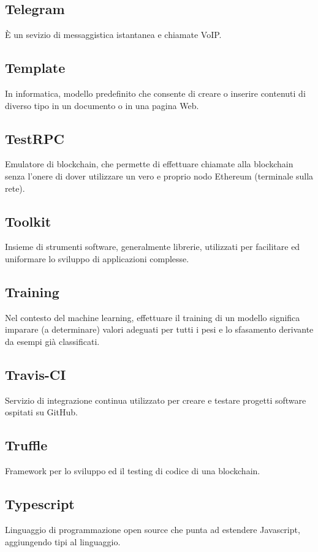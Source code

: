 	\subsection*{Telegram}
	È un sevizio di messaggistica istantanea e chiamate VoIP.
	\subsection*{Template}
	In informatica, modello predefinito che consente di creare o inserire contenuti di diverso tipo in un documento o in una pagina Web.
	\subsection*{TestRPC}
	Emulatore di blockchain, che permette di effettuare chiamate alla blockchain senza l'onere di dover utilizzare un vero e proprio nodo Ethereum (terminale sulla rete).
	\subsection*{Toolkit}
	Insieme di strumenti software, generalmente librerie, utilizzati per facilitare ed uniformare lo sviluppo di applicazioni complesse.
	\subsection*{Training}
	Nel contesto del machine learning, effettuare il training di un modello significa imparare (a determinare) valori adeguati per tutti i pesi e lo sfasamento derivante da esempi già classificati.
	\subsection*{Travis-CI}
	Servizio di integrazione continua utilizzato per creare e testare progetti software ospitati su GitHub.
	\subsection*{Truffle}
	Framework per lo sviluppo ed il testing di codice di una blockchain. 
	\subsection*{Typescript}
	Linguaggio di programmazione open source che punta ad estendere Javascript, aggiungendo tipi al linguaggio.
\pagebreak
